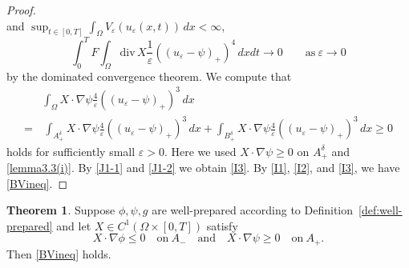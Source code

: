 \documentclass{amsart}
\theoremstyle{definition}
\newtheorem{theorem}[definition]{Theorem}
\newcommand{\divergence}{\mathrm{div}\,}
\begin{document}
\begin{proof}
\[\]
and $\sup_{t \in [0,T] } \int_\Omega V_\varepsilon (u_\varepsilon (x,t)) \, dx <\infty$,
\begin{equation}\label{J1-1}
\int_0 ^T F \int_\Omega \divergence X \frac{1}{\varepsilon} ((u_\varepsilon -\psi)_+)^4 \, dx dt
\to 0 \qquad \text{as} \ \varepsilon \to 0
\end{equation}
by the dominated convergence theorem. We compute that
\begin{equation}\label{J1-2}
\begin{split}
&\int_\Omega X \cdot \nabla \psi \frac{4}{\varepsilon} ((u_\varepsilon -\psi)_+)^3 \, dx \\
=& \, \int_{A_+ ^\delta} X \cdot \nabla \psi \frac{4}{\varepsilon} ((u_\varepsilon -\psi)_+)^3 \, dx
+ \int_{B_+ ^\delta} X \cdot \nabla \psi \frac{4}{\varepsilon} ((u_\varepsilon -\psi)_+)^3 \, dx
\geq 0
\end{split}
\end{equation}
holds for sufficiently small $\varepsilon >0$.
Here we used $X \cdot \nabla \psi \geq 0$ on $A_ + ^\delta$ and \eqref{lemma3.3(i)}.
By \eqref{J1-1} and \eqref{J1-2} we obtain \eqref{I3}.
By \eqref{I1}, \eqref{I2}, and \eqref{I3}, we have \eqref{BVineq}.
\end{proof}

\begin{theorem}\label{thm:3.4}
Suppose $\phi, \psi, g$ are well-prepared according to Definition~\ref{def:well-prepared} and let $X \in C^1 (\Omega \times [0,T])$ satisfy
    \[
    X \cdot \nabla \phi \leq 0 \quad \text{on} \ A_-
    \quad
    \text{and}
    \quad
    X\cdot \nabla \psi \geq 0 \quad \text{on} \ A_+.
    \]
Then \eqref{BVineq} holds.
\end{theorem}
\end{document}

